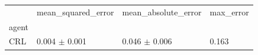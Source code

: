 \begin{tabular}{llll}
\toprule
 & mean_squared_error & mean_absolute_error & max_error \\
agent &  &  &  \\
\midrule
CRL & 0.004 $\pm$ 0.001 & 0.046 $\pm$ 0.006 & 0.163 \\
\bottomrule
\end{tabular}
